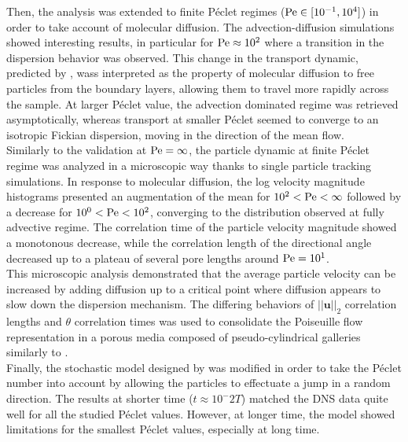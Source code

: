 Then, the analysis was extended to finite Péclet regimes ($\mathrm{Pe}\in[10^{-1}, 10^4]$) in order to take account of molecular diffusion.
The advection-diffusion simulations showed interesting results, in particular for $\mathrm{Pe}\approx 10^2$ where a transition in the dispersion behavior was observed.
This change in the transport dynamic, predicted by \citet{Meyer2016}, wass interpreted as the property of molecular diffusion to free particles from the boundary layers, allowing them to travel more rapidly across the sample.
At larger Péclet value, the advection dominated regime was retrieved asymptotically, whereas transport at smaller Péclet seemed to converge to an isotropic Fickian dispersion, moving in the direction of the mean flow.\\
Similarly to the validation at $\mathrm{Pe} = \infty$, the particle dynamic at finite Péclet regime was analyzed in a microscopic way thanks to single particle tracking simulations.
In response to molecular diffusion, the log velocity magnitude histograms presented an augmentation of the mean for $10^2<\mathrm{Pe}<\infty$ followed by a decrease for $10^0<\mathrm{Pe}<10^2$, converging to the distribution observed at fully advective regime.
The correlation time of the particle velocity magnitude showed a monotonous decrease, while the correlation length of the directional angle decreased up to a plateau of several pore lengths around $\mathrm{Pe}=10^1$.\\
This microscopic analysis demonstrated that the average particle velocity can be increased by adding diffusion up to a critical point where diffusion appears to slow down the dispersion mechanism.
The differing behaviors of $||\textbf{u}||_2$ correlation lengths and $\theta$ correlation times was used to consolidate the Poiseuille flow representation in a porous media composed of pseudo-cylindrical galleries similarly to \citet{Dentz2017}.\\

Finally, the stochastic model designed by \citet{Meyer2016} was modified in order to take the Péclet number into account by allowing the particles to effectuate a jump in a random direction.
The results at shorter time ($t\approx10^-2 T$) matched the DNS data quite well for all the studied Péclet values.
However, at longer time, the model showed limitations for the smallest Péclet values, especially at long time.


